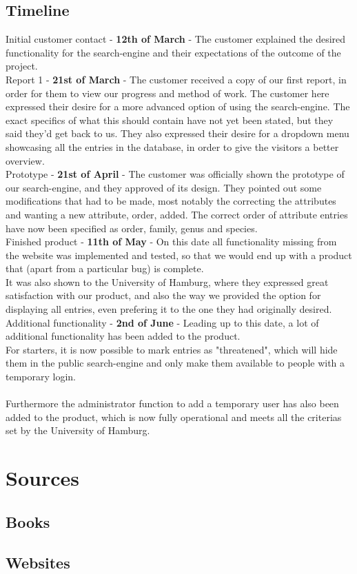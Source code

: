\documentclass[12pt,a4paper]{article}
\begin{document}
\subsection{Timeline}

	Initial customer contact - {\bf 12th of March} - The customer explained the desired functionality for the search-engine and their expectations of the outcome of the project. \\
	
	
	Report 1 - {\bf 21st of March} - The customer received a copy of our first report, in order for them to view our progress and method of work.
	The customer here expressed their desire for a more advanced option of using the search-engine. The exact specifics of what this should contain have not yet been stated, but they said they'd get back to us.
	They also expressed their desire for a dropdown menu showcasing all the entries in the database, in order to give the visitors a better overview.\\
	
	
	Prototype - {\bf 21st of April} - The customer was officially shown the prototype of our search-engine, and they approved of its design. They pointed out some modifications that had to be made, most notably the correcting the attributes and wanting a new attribute, order, added. The correct order of attribute entries have now been specified as order, family, genus and species.\\
	
	Finished product - {\bf 11th of May} - On this date all functionality missing from the website was implemented and tested, so that we would end up with a product that (apart from a particular bug) is complete.\\
	It was also shown to the University of Hamburg, where they expressed great satisfaction with our product, and also the way we provided the option for displaying all entries, even prefering it to the one they had originally desired.\\
	
	Additional functionality - {\bf 2nd of June} - Leading up to this date, a lot of additional functionality has been added to the product.\\
	For starters, it is now possible to mark entries as "threatened", which will hide them in the public search-engine and only make them available to people with a temporary login.\\
	\\Furthermore the administrator function to add a temporary user has also been added to the product, which is now fully operational and meets all the criterias set by the University of Hamburg.
	
	\newpage
\section{Sources}
\subsection{Books}
\subsection{Websites}
\end{document}
